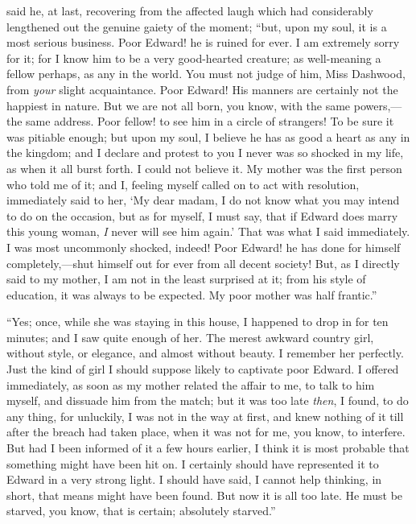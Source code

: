  said he, at last, recovering from the affected laugh which had considerably lengthened out the genuine gaiety of the moment; “but, upon my soul, it is a most serious business. Poor Edward! he is ruined for ever. I am extremely sorry for it; for I know him to be a very good-hearted creature; as well-meaning a fellow perhaps, as any in the world. You must not judge of him, Miss Dashwood, from {\em your} slight acquaintance. Poor Edward! His manners are certainly not the happiest in nature. But we are not all born, you know, with the same powers,---the same address. Poor fellow! to see him in a circle of strangers! To be sure it was pitiable enough; but upon my soul, I believe he has as good a heart as any in the kingdom; and I declare and protest to you I never was so shocked in my life, as when it all burst forth. I could not believe it. My mother was the first person who told me of it; and I, feeling myself called on to act with resolution, immediately said to her, ‘My dear madam, I do not know what you may intend to do on the occasion, but as for myself, I must say, that if Edward does marry this young woman, {\em I} never will see him again.' That was what I said immediately. I was most uncommonly shocked, indeed! Poor Edward! he has done for himself completely,---shut himself out for ever from all decent society! But, as I directly said to my mother, I am not in the least surprised at it; from his style of education, it was always to be expected. My poor mother was half frantic.”


“Yes; once, while she was staying in this house, I happened to drop in for ten minutes; and I saw quite enough of her. The merest awkward country girl, without style, or elegance, and almost without beauty. I remember her perfectly. Just the kind of girl I should suppose likely to captivate poor Edward. I offered immediately, as soon as my mother related the affair to me, to talk to him myself, and dissuade him from the match; but it was too late {\em then}, I found, to do any thing, for unluckily, I was not in the way at first, and knew nothing of it till after the breach had taken place, when it was not for me, you know, to interfere. But had I been informed of it a few hours earlier, I think it is most probable that something might have been hit on. I certainly should have represented it to Edward in a very strong light.  I should have said,  I cannot help thinking, in short, that means might have been found. But now it is all too late. He must be starved, you know, that is certain; absolutely starved.”

